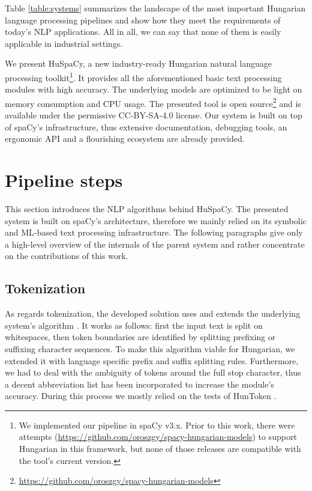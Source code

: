 \documentclass{llncs}
\newcommand{\huspacy}{HuSpaCy}
\newcommand{\huntoken}{HunToken}
\begin{document}
Table \ref{table:systems} summarizes the landscape of the most important Hungarian language processing pipelines and show how they meet the requirements of today’s NLP applications. All in all, we can say that none of them is easily applicable in industrial settings.

We present \huspacy{}, a new industry-ready Hungarian natural language processing toolkit\footnote{We implemented our pipeline in spaCy v3.x. Prior to this work, there were attempts (\url{https://github.com/oroszgy/spacy-hungarian-models}) to support Hungarian in this framework, but none of those releases are compatible with the tool’s current version.}. 
It provides all the aforementioned basic text processing modules with high accuracy. The underlying models are optimized to be light on memory consumption and CPU usage. The presented tool is open source\footnote{\url{https://github.com/oroszgy/spacy-hungarian-models}} and is available under the permissive CC-BY-SA-4.0 license. Our system is built on top of spaCy’s infrastructure, thus extensive documentation, debugging tools, an ergonomic API and a flourishing ecosystem are already provided.

\section{Pipeline steps}

This section introduces the NLP algorithms behind \huspacy{}. The presented system is built on spaCy’s architecture, therefore we mainly relied on its symbolic and ML-based text processing infrastructure. The following paragraphs give only a high-level overview of the internals of the parent system and rather concentrate on the contributions of this work.

\subsection{Tokenization}

As regards tokenization, the developed solution uses and extends the underlying system’s algorithm \citep{spacy-tokenization}. It works as follows: first the input text is split on whitespaces, then token boundaries are identified by splitting prefixing or suffixing character sequences. To make this algorithm viable for Hungarian, we extended it with language specific prefix and suffix splitting rules. Furthermore, we had to deal with the ambiguity of tokens around the full stop character, thus a decent abbreviation list has been incorporated to increase the module’s accuracy. During this process we mostly relied on the tests of \huntoken{} \citep{huntoken}.
\end{document}
